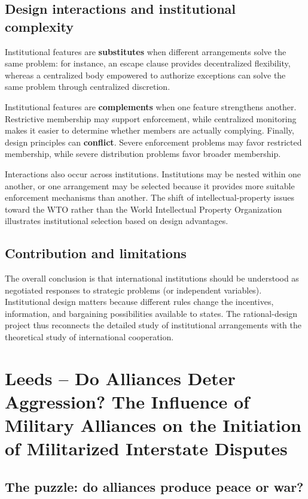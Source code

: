 \subsection{Design interactions and institutional complexity}

Institutional features are \textbf{substitutes} when different arrangements solve the same problem: for instance, an escape clause provides decentralized flexibility, whereas a centralized body empowered to authorize exceptions can solve the same problem through centralized discretion.

Institutional features are \textbf{complements} when one feature strengthens another. Restrictive membership may support enforcement, while centralized monitoring makes it easier to determine whether members are actually complying.
Finally, design principles can \textbf{conflict}. Severe enforcement problems may favor restricted membership, while severe distribution problems favor broader membership.

Interactions also occur across institutions. Institutions may be nested within one another, or one arrangement may be selected because it provides more suitable enforcement mechanisms than another. The shift of intellectual-property issues toward the WTO rather than the World Intellectual Property Organization illustrates institutional selection based on design advantages.

\subsection{Contribution and limitations}

The overall conclusion is that international institutions should be understood as negotiated responses to strategic problems (or independent variables). Institutional design matters because different rules change the incentives, information, and bargaining possibilities available to states. The rational-design project thus reconnects the detailed study of institutional arrangements with the theoretical study of international cooperation.

\clearpage
\section{Leeds -- Do Alliances Deter Aggression? The Influence of Military Alliances on the Initiation of Militarized Interstate Disputes}

\subsection{The puzzle: do alliances produce peace or war?}


